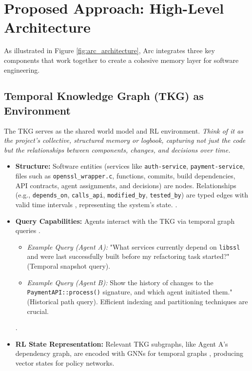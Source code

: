 \documentclass{article}
\begin{document}
\section{Proposed Approach: High-Level Architecture}
As illustrated in Figure \ref{fig:arc_architecture}, Arc integrates three key components that work together to create a cohesive memory layer for software engineering.

\subsection{Temporal Knowledge Graph (TKG) as Environment}
The TKG serves as the shared world model and RL environment. \textit{Think of it as the project's collective, structured memory or logbook, capturing not just the code but the relationships between components, changes, and decisions over time.}
\begin{itemize}
  \item \textbf{Structure:} Software entities (services like \verb|auth-service|, \verb|payment-service|, files such as \verb|openssl_wrapper.c|, functions, commits, build dependencies, API contracts, agent assignments, and decisions) are nodes. Relationships (e.g., \verb|depends_on|, \verb|calls_api|, \verb|modified_by|, \verb|tested_by|) are typed edges with valid time intervals \cite{ref8}, representing the system's state. \cite{ref23}.
  \item \textbf{Query Capabilities:} Agents interact with the TKG via temporal graph queries \cite{ref_zep_lc}.
\begin{itemize}
    \item \textit{Example Query (Agent A):} "What services currently depend on \verb|libssl| and were last successfully built before my refactoring task started?" (Temporal snapshot query).
    \item \textit{Example Query (Agent B):} Show the history of changes to the \verb|PaymentAPI::process()| signature, and which agent initiated them." (Historical path query). Efficient indexing and partitioning techniques are crucial.
\end{itemize}
 \cite{ref24,ref32,ref33}.
  \item \textbf{RL State Representation:} Relevant TKG subgraphs, like Agent A's dependency graph, are encoded with GNNs for temporal graphs \cite{ref15,ref23,ref28,ref36}, producing vector states for policy networks.
\end{itemize}
\end{document}
